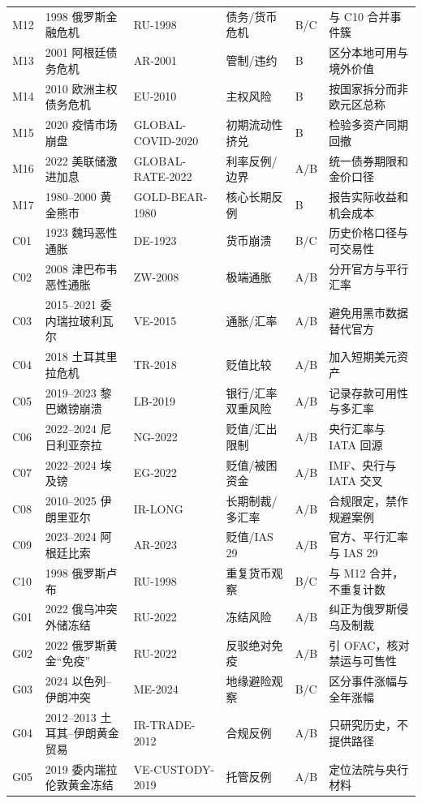 \documentclass[UTF8,12pt,openany]{ctexbook}
\begin{document}
\begin{landscape}
\begin{longtable}{p{1.1cm}p{5.1cm}p{3.0cm}p{3.0cm}p{2.0cm}p{4.0cm}}
M12 & 1998 俄罗斯金融危机 & RU-1998 & 债务/货币危机 & B/C & 与 C10 合并事件簇\\
M13 & 2001 阿根廷债务危机 & AR-2001 & 管制/违约 & B & 区分本地可用与境外价值\\
M14 & 2010 欧洲主权债务危机 & EU-2010 & 主权风险 & B & 按国家拆分而非欧元区总称\\
M15 & 2020 疫情市场崩盘 & GLOBAL-COVID-2020 & 初期流动性挤兑 & B & 检验多资产同期回撤\\
M16 & 2022 美联储激进加息 & GLOBAL-RATE-2022 & 利率反例/边界 & A/B & 统一债券期限和金价口径\\
M17 & 1980--2000 黄金熊市 & GOLD-BEAR-1980 & 核心长期反例 & B & 报告实际收益和机会成本\\
\midrule
C01 & 1923 魏玛恶性通胀 & DE-1923 & 货币崩溃 & B/C & 历史价格口径与可交易性\\
C02 & 2008 津巴布韦恶性通胀 & ZW-2008 & 极端通胀 & A/B & 分开官方与平行汇率\\
C03 & 2015--2021 委内瑞拉玻利瓦尔 & VE-2015 & 通胀/汇率 & A/B & 避免用黑市数据替代官方\\
C04 & 2018 土耳其里拉危机 & TR-2018 & 贬值比较 & A/B & 加入短期美元资产\\
C05 & 2019--2023 黎巴嫩镑崩溃 & LB-2019 & 银行/汇率双重风险 & A/B & 记录存款可用性与多汇率\\
C06 & 2022--2024 尼日利亚奈拉 & NG-2022 & 贬值/汇出限制 & A/B & 央行汇率与 IATA 回源\\
C07 & 2022--2024 埃及镑 & EG-2022 & 贬值/被困资金 & A/B & IMF、央行与 IATA 交叉\\
C08 & 2010--2025 伊朗里亚尔 & IR-LONG & 长期制裁/多汇率 & A/B & 合规限定，禁作规避案例\\
C09 & 2023--2024 阿根廷比索 & AR-2023 & 贬值/IAS 29 & A/B & 官方、平行汇率与 IAS 29\\
C10 & 1998 俄罗斯卢布 & RU-1998 & 重复货币观察 & B/C & 与 M12 合并，不重复计数\\
\midrule
G01 & 2022 俄乌冲突外储冻结 & RU-2022 & 冻结风险 & A/B & 纠正为俄罗斯侵乌及制裁\\
G02 & 2022 俄罗斯黄金“免疫” & RU-2022 & 反驳绝对免疫 & A/B & 引 OFAC，核对禁运与可售性\\
G03 & 2024 以色列--伊朗冲突 & ME-2024 & 地缘避险观察 & B/C & 区分事件涨幅与全年涨幅\\
G04 & 2012--2013 土耳其--伊朗黄金贸易 & IR-TRADE-2012 & 合规反例 & A/B & 只研究历史，不提供路径\\
G05 & 2019 委内瑞拉伦敦黄金冻结 & VE-CUSTODY-2019 & 托管反例 & A/B & 定位法院与央行材料\\

\end{longtable}
\end{landscape}
\end{document}
